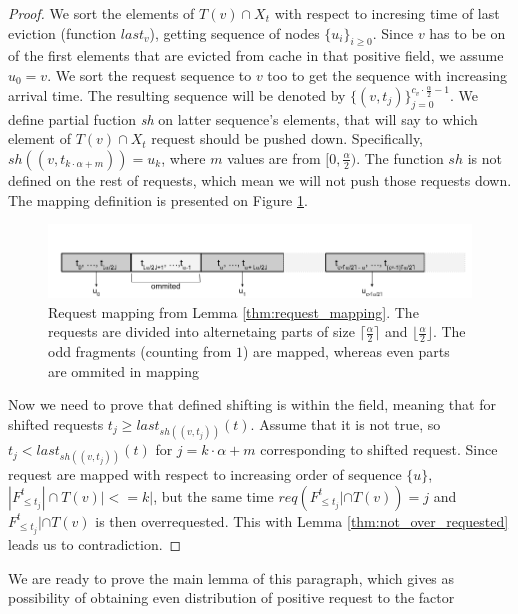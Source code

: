 \begin{proof}
We sort the elements of $T(v) \cap X_t$ with respect to incresing time of last 
eviction (function $last_v$), getting sequence of nodes $\{u_i\}_{i \geq 
0}$. Since $v$ has to be on of the first elements that are evicted from cache 
in that positive field, we assume $u_0 = v$. We sort the request sequence to 
$v$ too to get the sequence with increasing arrival time. The resulting 
sequence will be denoted by $\{(v, t_j)\}_{j=0}^{c_v \cdot \frac{\alpha}{2} - 
1}$. We define partial fuction \textit{sh} on latter sequence's 
elements, that will say to which element of $T(v) \cap X_t$ request should be 
pushed down. Specifically, $sh((v, t_{k \cdot \alpha + m})) = u_k$, where $m$ 
values are from $[0, \frac{\alpha}{2})$. The function $sh$ is not defined on 
the rest of requests, which mean we will not push those requests down. The 
mapping definition is presented on Figure \ref{fig:req_map}.
\begin{figure}
 \begin{center}
  \includegraphics[width=1.1\textwidth]{request_mapping.png}
 \end{center}
 \caption{Request mapping from Lemma \ref{thm:request_mapping}. The requests 
are divided into alternetaing parts of size $\lceil \frac{\alpha}{2} \rceil$ 
and $\lfloor \frac{\alpha}{2} \rfloor$. The odd fragments (counting from $1$) 
are mapped, whereas even parts are ommited in mapping}
 \label{fig:req_map}
\end{figure}

Now we need to prove that defined shifting is within the field, meaning that 
for shifted requests $t_j \geq last_{sh((v, t_j))}(t)$. Assume that it is not 
true, so $t_j < last_{sh((v, t_j))}(t)$ for $j = k \cdot \alpha + m$ 
corresponding to shifted request. Since request are mapped with respect to 
increasing order of sequence $\{u\}$, $|F^t_{\leq t_j}| \cap T(v)| <= k|$, but 
the same time $req(F^t_{\leq t_j}| \cap T(v)) = j$ and $F^t_{\leq t_j}| \cap 
T(v)$ is then overrequested. This with Lemma \ref{thm:not_over_requested} leads 
us to contradiction.
\end{proof}
We are ready to prove the main lemma of this paragraph, which gives as 
possibility of obtaining even distribution of positive request to the factor 
